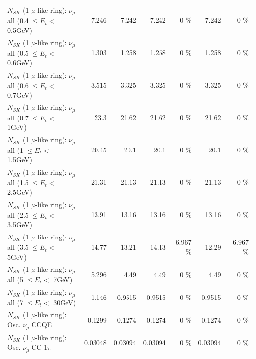 \begin{table}
\begin{tabular}{| l | r | r | r  r | r  r |}
       $N_{SK}$ (1 $\mu$-like ring): $\nu_{\mu}$ all (0.4 $\leq E_{t} <$ 0.5GeV) &           7.246 &           7.242 &           7.242 &        0 \%  &           7.242 &        0 \%  \\ 
       $N_{SK}$ (1 $\mu$-like ring): $\nu_{\mu}$ all (0.5 $\leq E_{t} <$ 0.6GeV) &           1.303 &           1.258 &           1.258 &        0 \%  &           1.258 &        0 \%  \\ 
       $N_{SK}$ (1 $\mu$-like ring): $\nu_{\mu}$ all (0.6 $\leq E_{t} <$ 0.7GeV) &           3.515 &           3.325 &           3.325 &        0 \%  &           3.325 &        0 \%  \\ 
         $N_{SK}$ (1 $\mu$-like ring): $\nu_{\mu}$ all (0.7 $\leq E_{t} <$ 1GeV) &            23.3 &           21.62 &           21.62 &        0 \%  &           21.62 &        0 \%  \\ 
         $N_{SK}$ (1 $\mu$-like ring): $\nu_{\mu}$ all (1 $\leq E_{t} <$ 1.5GeV) &           20.45 &            20.1 &            20.1 &        0 \%  &            20.1 &        0 \%  \\ 
       $N_{SK}$ (1 $\mu$-like ring): $\nu_{\mu}$ all (1.5 $\leq E_{t} <$ 2.5GeV) &           21.31 &           21.13 &           21.13 &        0 \%  &           21.13 &        0 \%  \\ 
       $N_{SK}$ (1 $\mu$-like ring): $\nu_{\mu}$ all (2.5 $\leq E_{t} <$ 3.5GeV) &           13.91 &           13.16 &           13.16 &        0 \%  &           13.16 &        0 \%  \\ 
         $N_{SK}$ (1 $\mu$-like ring): $\nu_{\mu}$ all (3.5 $\leq E_{t} <$ 5GeV) &           14.77 &           13.21 &           14.13 &    6.967 \%  &           12.29 &   -6.967 \%  \\ 
           $N_{SK}$ (1 $\mu$-like ring): $\nu_{\mu}$ all (5 $\leq E_{t} <$ 7GeV) &           5.296 &            4.49 &            4.49 &        0 \%  &            4.49 &        0 \%  \\ 
          $N_{SK}$ (1 $\mu$-like ring): $\nu_{\mu}$ all (7 $\leq E_{t} <$ 30GeV) &           1.146 &          0.9515 &          0.9515 &        0 \%  &          0.9515 &        0 \%  \\ 
\hline
\hline
                               $N_{SK}$ (1 $\mu$-like ring): Osc. $\nu_\mu$ CCQE &          0.1299 &          0.1274 &          0.1274 &        0 \%  &          0.1274 &        0 \%  \\ 
                          $N_{SK}$ (1 $\mu$-like ring): Osc. $\nu_\mu$ CC 1$\pi$ &         0.03048 &         0.03094 &         0.03094 &        0 \%  &         0.03094 &        0 \%  \\ 

\end{tabular}
\end{table}
